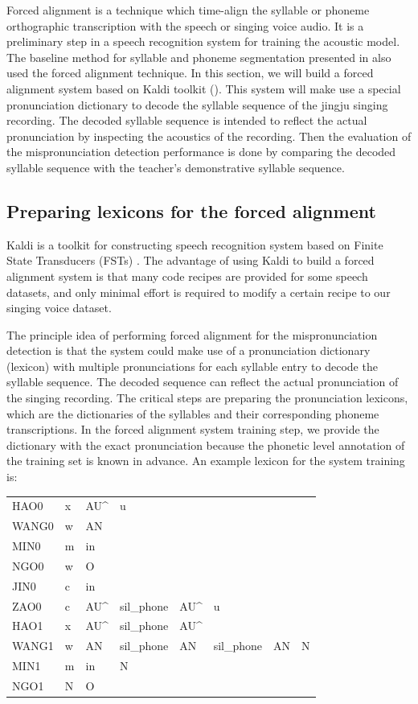 Forced alignment is a technique which time-align the syllable or phoneme orthographic transcription with the speech or singing voice audio. It is a preliminary step in a speech recognition system for training the acoustic model. The baseline method for syllable and phoneme segmentation presented in  also used the forced alignment technique. In this section, we will build a forced alignment system based on Kaldi toolkit (). This system will make use a special pronunciation dictionary to decode the syllable sequence of the jingju singing recording. The decoded syllable sequence is intended to reflect the actual pronunciation by inspecting the acoustics of the recording. Then the evaluation of the mispronunciation detection performance is done by comparing the decoded syllable sequence with the teacher's demonstrative syllable sequence.

\subsection{Preparing lexicons for the forced alignment}

Kaldi is a toolkit for constructing speech recognition system based on Finite State Transducers (FSTs) \cite{Mohri2002}. The advantage of using Kaldi to build a forced alignment system is that many code recipes are provided for some speech datasets, and only minimal effort is required to modify a certain recipe to our singing voice dataset.

The principle idea of performing forced alignment for the mispronunciation detection is that the system could make use of a pronunciation dictionary (lexicon) with multiple pronunciations for each syllable entry to decode the syllable sequence. The decoded sequence can reflect the actual pronunciation of the singing recording. The critical steps are preparing the pronunciation lexicons, which are the dictionaries of the syllables and their corresponding phoneme transcriptions. In the forced alignment system training step, we provide the dictionary with the exact pronunciation because the phonetic level annotation of the training set is known in advance. An example lexicon for the system training is:

\begin{table}[ht!]
\begin{tabular}{llllllll}
HAO0 & x & AU\^ & u & & & &  \\
WANG0 & w & AN & & & & & \\
MIN0 & m & in & & & & & \\
NGO0 & w & O & & & & & \\
JIN0 & c & in & & & & & \\
ZAO0 & c & AU\^ & sil\_phone & AU\^ & u & & \\
HAO1 & x & AU\^ & sil\_phone & AU\^ & & & \\
WANG1 & w & AN & sil\_phone & AN & sil\_phone & AN & N \\
MIN1 & m & in & N & & & & \\
NGO1 & N & O & & & & &
\end{tabular}
\end{table}

